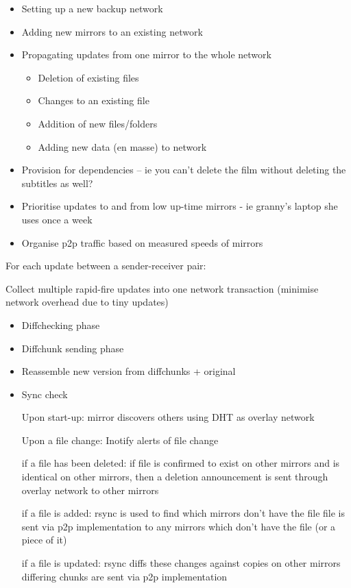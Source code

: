\documentclass[12pt,a4paper,]{adreport}
\begin{document}
\begin{itemize}
\itemsep1pt\parskip0pt
\item
  Setting up a new backup network
\item
  Adding new mirrors to an existing network
\item
  Propagating updates from one mirror to the whole network

  \begin{itemize}
  \itemsep1pt\parskip0pt
  \item
    Deletion of existing files
  \item
    Changes to an existing file
  \item
    Addition of new files/folders
  \item
    Adding new data (en masse) to network
  \end{itemize}
\item
  Provision for dependencies -- ie you can't delete the film without
  deleting the subtitles as well?
\item
  Prioritise updates to and from low up-time mirrors - ie granny's
  laptop she uses once a week
\item
  Organise p2p traffic based on measured speeds of mirrors
\end{itemize}

For each update between a sender-receiver pair:

Collect multiple rapid-fire updates into one network transaction
(minimise network overhead due to tiny updates)

\begin{itemize}
\item
  Diffchecking phase
\item
  Diffchunk sending phase
\item
  Reassemble new version from diffchunks + original
\item
  Sync check

  Upon start-up: mirror discovers others using DHT as overlay network

  Upon a file change: Inotify alerts of file change

  if a file has been deleted: if file is confirmed to exist on other
  mirrors and is identical on other mirrors, then a deletion
  announcement is sent through overlay network to other mirrors

  if a file is added: rsync is used to find which mirrors don't have the
  file file is sent via p2p implementation to any mirrors which don't
  have the file (or a piece of it)

  if a file is updated: rsync diffs these changes against copies on
  other mirrors differing chunks are sent via p2p implementation
\end{itemize}
\end{document}
